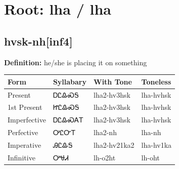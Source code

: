 \documentclass{article}%
\begin{document}
%
\normalsize%
\section*{Root: lha / lha}%
\subsection*{hvsk-nh[inf4]}%
\textbf{Definition: }%
he/she is placing it on something%
\\[0.5em]%
\begin{tabular}{|l|l|l|l|}%
\hline%
\textbf{Form}&\textbf{Syllabary}&\textbf{With Tone}&\textbf{Toneless}\\%
\hline%
Present&ᎠᏝᎲᏍᎦ&lha2{-}hv3hsk&lha{-}hvhsk\\%
1st Present&ᏥᏝᎲᏍᎦ&lha2{-}hv3hsk&lha{-}hvhsk\\%
Imperfective&ᎠᏝᎲᏍᎪᎢ&lha2{-}hv3hsk&lha{-}hvhsk\\%
Perfective&ᎤᏝᏅᎢ&lha2{-}nh&lha{-}nh\\%
Imperative&ᎯᏝᎲᎦ&lha2{-}hv21ka2&lha{-}hv1ka\\%
Infinitive&ᎤᏠᏗ&lh{-}o2ht&lh{-}oht\\%
\hline%
\end{tabular}%
\\[1em]%
\end{document}
